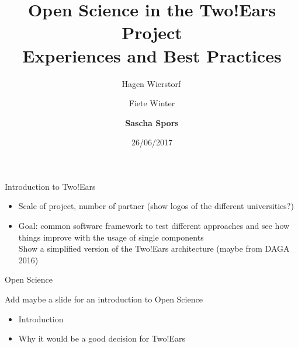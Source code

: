 \documentclass{beamer}
\begin{document}
\title{\centering Open Science in the Two!Ears Project \\ Experiences and Best Practices}
\author{Hagen Wierstorf$\,$ \and
        Fiete Winter \and
        \textbf{Sascha Spors}}
\date{26/06/2017}
\maketitle

\begin{frame}{Introduction to Two!Ears}

    \begin{itemize}
        \item Scale of project, number of partner (show logos of the different
            universities?)
        \item Goal: common software framework to test different approaches and
            see how things improve with the usage of single components \\
            Show a simplified version of the Two!Ears architecture (maybe from
            DAGA 2016)
    \end{itemize}

\end{frame}

\begin{frame}{Open Science}

    Add maybe a slide for an introduction to Open Science

    \begin{itemize}
        \item Introduction
        \item Why it would be a good decision for Two!Ears
    \end{itemize}

\end{frame}
\end{document}
